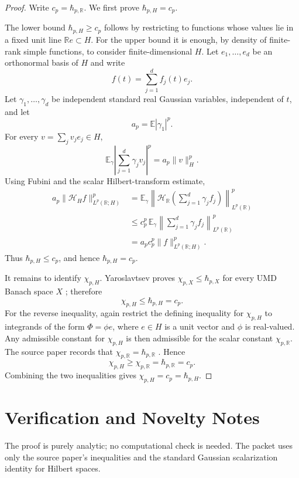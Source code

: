 \documentclass[11pt]{article}
\begin{document}
\begin{proof}
Write \(c_p=\hbar_{p,\mathbb R}\).  We first prove
\(\hbar_{p,H}=c_p\).

The lower bound \(\hbar_{p,H}\geq c_p\) follows by restricting to functions
whose values lie in a fixed unit line \(\mathbb R e\subset H\).  For the upper
bound it is enough, by density of finite-rank simple functions, to consider
finite-dimensional \(H\).  Let \(e_1,\ldots,e_d\) be an orthonormal basis of
\(H\) and write
\[
  f(t)=\sum_{j=1}^d f_j(t)e_j.
\]
Let \(\gamma_1,\ldots,\gamma_d\) be independent standard real Gaussian
variables, independent of \(t\), and let
\[
  a_p=\mathbb E|\gamma_1|^p.
\]
For every \(v=\sum_j v_j e_j\in H\),
\[
  \mathbb E_\gamma \left|\sum_{j=1}^d \gamma_j v_j\right|^p
  =a_p\|v\|_H^p.
\]
Using Fubini and the scalar Hilbert-transform estimate,
\begin{align*}
  a_p\|\mathcal H_H f\|_{L^p(\mathbb R;H)}^p
  &= \mathbb E_\gamma
     \left\|\mathcal H_{\mathbb R}\left(\sum_{j=1}^d\gamma_j f_j\right)
     \right\|_{L^p(\mathbb R)}^p  \\
  &\leq c_p^p\,\mathbb E_\gamma
     \left\|\sum_{j=1}^d\gamma_j f_j\right\|_{L^p(\mathbb R)}^p \\
  &= a_p c_p^p\|f\|_{L^p(\mathbb R;H)}^p .
\end{align*}
Thus \(\hbar_{p,H}\leq c_p\), and hence \(\hbar_{p,H}=c_p\).

It remains to identify \(\chi_{p,H}\).  Yaroslavtsev proves
\(\chi_{p,X}\leq \hbar_{p,X}\) for every UMD Banach space \(X\)
\cite[Corollary 3.5]{Yaroslavtsev2018}; therefore
\[
  \chi_{p,H}\leq \hbar_{p,H}=c_p.
\]
For the reverse inequality, again restrict the defining inequality for
\(\chi_{p,H}\) to integrands of the form \(\Phi=\phi e\), where \(e\in H\) is
a unit vector and \(\phi\) is real-valued.  Any admissible constant for
\(\chi_{p,H}\) is then admissible for the scalar constant \(\chi_{p,\mathbb R}\).
The source paper records that \(\chi_{p,\mathbb R}=\hbar_{p,\mathbb R}\)
\cite[p.~3 and Remark 3.6]{Yaroslavtsev2018}.  Hence
\[
  \chi_{p,H}\geq \chi_{p,\mathbb R}=\hbar_{p,\mathbb R}=c_p.
\]
Combining the two inequalities gives \(\chi_{p,H}=c_p=\hbar_{p,H}\).
\end{proof}

\section*{Verification and Novelty Notes}

The proof is purely analytic; no computational check is needed.  The packet
uses only the source paper's inequalities and the standard Gaussian
scalarization identity for Hilbert spaces.
\end{document}
